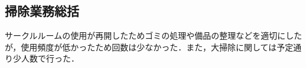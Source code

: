 \subsection*{掃除業務総括}

サークルルームの使用が再開したためゴミの処理や備品の整理などを適切にしたが，使用頻度が低かったため回数は少なかった．また，大掃除に関しては予定通り少人数で行った．
